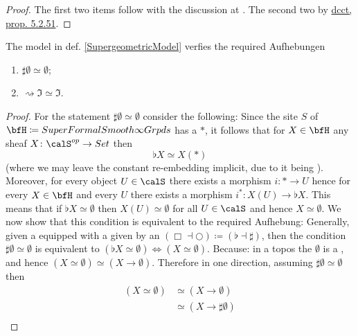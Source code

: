 \begin{proof}
The first two items follow with the discussion at . The second two by \hyperlink{dcct}{dcct, prop. 5.2.51}.
\end{proof}
\begin{prop}
\label{SublationsRealized}\hypertarget{SublationsRealized}{}
The model in def. \ref{SupergeometricModel} verfies the required Aufhebungen
\begin{enumerate}%
\item $\sharp \emptyset \simeq \emptyset$;
\item $\rightsquigarrow \Im \simeq \Im$.
\end{enumerate}
\end{prop}
\begin{proof}
For the statement $\sharp \emptyset \simeq \emptyset$ consider the following:
Since the site $S$ of $\bfH \coloneqq SuperFormalSmooth\infty Grpds$ has a  $\ast$, it follows that for $X\in \bfH$ any sheaf $X \colon \calS^{op}\to Set$ then
\begin{displaymath}
\flat X \simeq X(\ast)
\end{displaymath}
(where we may leave the constant re-embedding implicit, due to it being ).
Moreover, for every object $U\in \calS$ there exists a morphism $i \colon \ast \to U$ hence for every $X\in \bfH$ and every $U$ there exists a morphism $i^\ast \colon X(U)\to \flat X$. This means that if $\flat X \simeq \emptyset$ then $X(U) \simeq \emptyset$ for all $U \in \calS$ and hence $X\simeq \emptyset$.
We now show that this condition is equivalent to the required Aufhebung:
Generally, given a  equipped with a  given by an  $(\Box\dashv \bigcirc) \coloneqq (\flat \dashv \sharp)$, then the condition $\sharp \emptyset \simeq \emptyset$ is equivalent to $(\flat X \simeq \emptyset) \Leftrightarrow (X \simeq \emptyset)$.
Because: in a topos the  $\emptyset$ is a , and hence $(X \simeq \emptyset) \simeq (X \to \emptyset)$. Therefore in one direction, assuming $\sharp \emptyset \simeq \emptyset$ then
\begin{displaymath}
\begin{aligned}
(X \simeq \emptyset)
& \simeq
(X \to \emptyset)
\\
& \simeq (X \to \sharp \emptyset)
\\

\end{aligned}
\end{displaymath}
\end{proof}
